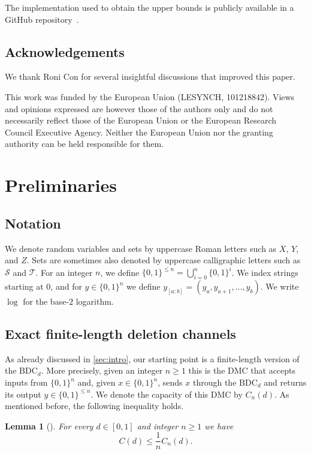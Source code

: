 \documentclass[11pt]{article}
\newcommand{\cS}{\mathcal{S}}
\newcommand{\cT}{\mathcal{T}}
\newtheorem{lemma}{Lemma}
\newcommand{\bits}{\{0,1\}}
\newcommand{\BDC}{\mathrm{BDC}}
\newcommand{\fCap}{C}
\begin{document}
The implementation used to obtain the upper bounds is publicly available in a GitHub repository~\cite{repo}.


\subsection{Acknowledgements}

We thank Roni Con for several insightful discussions that improved this paper.

This work was funded by the European Union (LESYNCH, 101218842).
Views and opinions expressed are however those of the authors only and do not necessarily reflect those of the European Union or the European Research Council Executive Agency. Neither the European Union nor the granting authority can be held responsible for them.







\section{Preliminaries}
\label{sec:prelims}

\subsection{Notation}

We denote random variables and sets by uppercase Roman letters such as $X$, $Y$, and $Z$.
Sets are sometimes also denoted by uppercase calligraphic letters such as $\cS$ and $\cT$.
For an integer $n$, we define $\bits^{\leq n}=\bigcup_{i=0}^n \bits^i$.
We index strings starting at $0$, and for $y\in\bits^n$ we define $y_{[a:b]}=(y_a,y_{a+1},\dots,y_b)$.
We write $\log$ for the base-$2$ logarithm.


\subsection{Exact finite-length deletion channels}\label{sec:aux-channel}

As already discussed in \cref{sec:intro}, our starting point is a finite-length version of the $\BDC_d$.
More precisely, given an integer $n\geq 1$ this is the DMC that accepts inputs from $\bits^n$ and, given $x\in\bits^n$, sends $x$ through the $\BDC_d$ and returns its output $y\in\bits^{\leq n}$.
We denote the capacity of this DMC by $\fCap_n(d)$.
As mentioned before, the following inequality holds.
\begin{lemma}[]
    For every $d\in[0,1]$ and integer $n\geq 1$ we have
    \begin{equation*}
        C(d)\leq \frac{1}{n}\fCap_n(d).
    \end{equation*}
\end{lemma}
\end{document}

